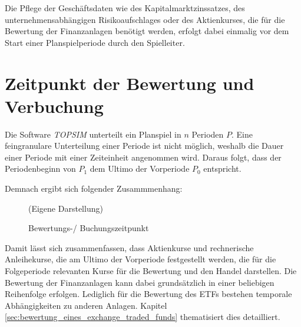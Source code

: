 \documentclass[12pt, a4paper]{article}
\theoremstyle{plain}
\begin{document}
Die Pflege der Geschäftsdaten wie des Kapitalmarktzinssatzes, des unternehmensabhängigen Risikoaufschlages oder des Aktienkurses, die für die Bewertung der Finanzanlagen benötigt werden, erfolgt dabei einmalig vor dem Start einer Planspielperiode durch den Spielleiter.

\section{Zeitpunkt der Bewertung und Verbuchung}
\label{sec:zeitpunkt_und_durchfuehrung_der_bewertung_buchung}


Die Software \textit{TOPSIM} unterteilt ein Planspiel in $n$ Perioden $P$.
Eine feingranulare Unterteilung einer Periode ist nicht möglich, weshalb die Dauer einer Periode mit einer Zeiteinheit angenommen wird.
Daraus folgt, dass der Periodenbeginn von $P_1$ dem Ultimo der Vorperiode $P_0$ entspricht.

Demnach ergibt sich folgender Zusammmenhang:

\begin{figure}[htb]
	\centering
	\caption{Bewertungs-/ Buchungszeitpunkt}
	\label{img:zeitstrahl_pewertung}
	(Eigene Darstellung)
\end{figure}

Damit lässt sich zusammenfassen, dass Aktienkurse und rechnerische Anleihekurse, die am Ultimo der Vorperiode festgestellt werden, die für die Folgeperiode relevanten Kurse für die Bewertung und den Handel darstellen.
Die Bewertung der Finanzanlagen kann dabei grundsätzlich in einer beliebigen Reihenfolge erfolgen.
Lediglich für die Bewertung des \glspl{ETF} bestehen temporale Abhängigkeiten zu anderen Anlagen. Kapitel \ref{sec:bewertung_eines_exchange_traded_funds} thematisiert dies detailliert.
\end{document}
